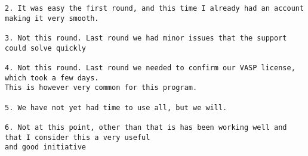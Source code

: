 {\begin{verbatim}
2. It was easy the first round, and this time I already had an account making it very smooth.

3. Not this round. Last round we had minor issues that the support could solve quickly

4. Not this round. Last round we needed to confirm our VASP license, which took a few days. 
This is however very common for this program.

5. We have not yet had time to use all, but we will.

6. Not at this point, other than that is has been working well and that I consider this a very useful 
and good initiative
\end{verbatim}
}
